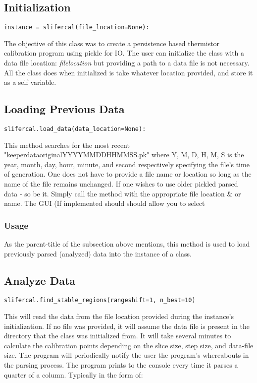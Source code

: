 \documentclass[12pt]{article}
\begin{document}
\subsection{Initialization}
\label{sec:slifercal}
\begin{lstlisting}
instance = slifercal(file_location=None):
\end{lstlisting}
The objective of this class was to create a persistence based thermistor calibration program using pickle for I\/O. The user can initialize the class with a data file location: \textit{file{\textunderscore}location} but providing a path to a data file is not necessary. All the class does when initialized is take whatever location provided, and store it as a self variable.
\subsection{Loading Previous Data}
\label{subsec:Loading Previous Data}
\begin{lstlisting}
slifercal.load_data(data_location=None):
\end{lstlisting}
This method searches for the most recent "keeper{\textunderscore}data{\textunderscore}original{\textunderscore}YYYY{\textunderscore}MM{\textunderscore}DD{\textunderscore}HHMMSS.pk" where Y, M, D, H, M, S is the year, month, day, hour, minute, and second respectively specifying the file's time of generation. One does not have to provide a file name or location so long as the name of the file remains unchanged. If one wishes to use older pickled parsed data - so be it. Simply call the method with the appropriate file location \& or name. The GUI (If implemented should  should allow you to select 
\subsubsection{Usage}
As the parent-title of the subsection above mentions, this method is used to load previously parsed (analyzed) data into the instance of a class. 
\subsection{Analyze Data}
\label{subsec:Analyze Data}
\begin{lstlisting}
slifercal.find_stable_regions(rangeshift=1, n_best=10)
\end{lstlisting}
This will read the data from the file location provided during the instance's initialization. If no file was provided, it will assume the data file is present in the directory that the class was initialized from. It will take several minutes to calculate the calibration points depending on the slice size, step size, and data-file size. The program will periodically notify the user the program's whereabouts in the parsing process. The program prints to the console every time it parses a quarter of a column. Typically in the form of:
\end{document}

